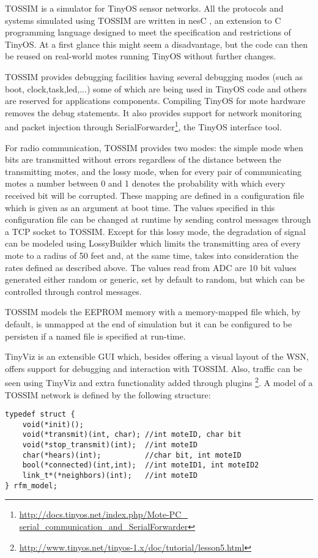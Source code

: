 \label{subsec:tossim}
TOSSIM\cite{tossim} is a simulator for TinyOS sensor networks.
All the protocols and systems simulated using TOSSIM are written in nesC \cite{nesC},
an extension to C programming language designed to meet the specification and 
restrictions of TinyOS. At a first glance this might seem a disadvantage, but 
the code can then be reused on real-world motes running TinyOS
without further changes.

TOSSIM provides debugging facilities having several debugging modes 
(such as boot, clock,task,led,...) some of which are being used in TinyOS code
and others are reserved for applications components. Compiling TinyOS for mote
hardware removes the debug statements.
It also provides support for network monitoring and packet injection
through SerialForwarder\footnote{\url{http://docs.tinyos.net/index.php/Mote-PC_
serial_communication_and_SerialForwarder}}, the TinyOS interface tool.

For radio communication, TOSSIM provides two modes: the simple mode when bits
are transmitted without errors regardless of the distance between the transmitting
motes, and the lossy mode, when for every pair of communicating motes a number between 0 and 1 
denotes the probability with which every received bit will be corrupted. These 
mapping are defined in a configuration file which is given as an argument at boot
time. The values specified in this configuration file can be changed at runtime
by sending control messages through a TCP socket to TOSSIM.
 Except for this lossy mode, the degradation of signal can be modeled using
LossyBuilder which limits the transmitting area of every mote to a radius of 50
 feet and, at the same time, takes into consideration the rates defined as 
described above.
The values read from ADC are 10 bit values generated either random or generic, set
by default to random, but which can be controlled through control messages.

TOSSIM models the EEPROM memory with a memory-mapped file which, by default, is
unmapped at the end of simulation but it can be configured to be persisten if a
named file is specified at run-time.

TinyViz is an extensible GUI which, besides offering a visual layout of the 
WSN, offers support for debugging and interaction with TOSSIM. Also, traffic can
be seen using TinyViz and extra functionality added through plugins
\footnote{\url{http://www.tinyos.net/tinyos-1.x/doc/tutorial/lesson5.html}}.
A model of a TOSSIM network is defined by the following structure:
\lstset{numbers=none,captionpos=b,frame=single,language=C,caption=Structure for defining a network in TOSSIM,label=lst:tossimnet}
\begin{lstlisting}
typedef struct {
    void(*init)();
    void(*transmit)(int, char); //int moteID, char bit
    void(*stop_transmit)(int);  //int moteID
    char(*hears)(int);          //char bit, int moteID
    bool(*connected)(int,int);  //int moteID1, int moteID2
    link_t*(*neighbors)(int);   //int moteID
} rfm_model;
\end{lstlisting}


